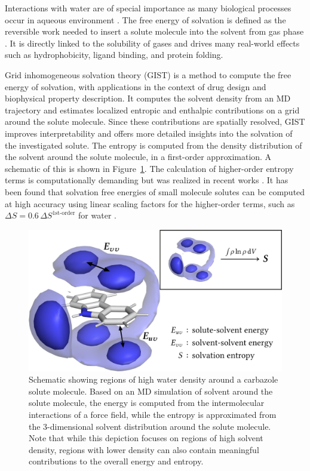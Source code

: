 \documentclass[9pt,tutorial]{livecoms}
\begin{document}
Interactions with water are of special importance as many biological processes occur in aqueous environment \cite{Privalov2017-water-review}.
The free energy of solvation is defined as the reversible work needed to insert a solute molecule into the solvent from gas phase \cite{ben-naim-book}.
It is directly linked to the solubility of gases and drives many real-world effects such as hydrophobicity, ligand binding, and protein folding.

Grid inhomogeneous solvation theory (GIST) \cite{Nguyen2012} is a method to compute the free energy of solvation, with applications in the context of drug design and biophysical property description.
It computes the solvent density from an MD trajectory and estimates localized entropic and enthalpic contributions on a grid around the solute molecule.
Since these contributions are spatially resolved, GIST improves interpretability and offers more detailed insights into the solvation of the investigated solute. 
The entropy is computed from the density distribution of the solvent around the solute molecule, in a first-order approximation. A schematic of this is shown in Figure~\ref{fig:carbazole}. 
The calculation of higher-order entropy terms is computationally demanding but was realized in recent works \cite{Nguyen2016-gist-second-order, Waibl2021-gist-salt}.
It has been found that solvation free energies of small molecule solutes can be computed at high accuracy using linear scaling factors for the higher-order terms, such as $\Delta S = 0.6\, \Delta S^\text{1st-order}$ for water \cite{Chen2021,Waibl2022-gist-solvents}.

\begin{figure}
    \centering
    \includegraphics[width=\linewidth]{figures/carbazole-figure.png}
    \caption{Schematic showing regions of high water density around a carbazole solute molecule. Based on an MD simulation of solvent around the solute molecule, the energy is computed from the intermolecular interactions of a force field, while the entropy is approximated from the 3-dimensional solvent distribution around the solute molecule. Note that while this depiction focuses on regions of high solvent density, regions with lower density can also contain meaningful contributions to the overall energy and entropy.}
    \label{fig:carbazole}
\end{figure}
\end{document}
